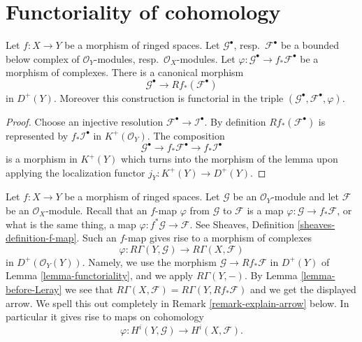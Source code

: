 \section{Functoriality of cohomology}
\label{section-functoriality}

\begin{lemma}
\label{lemma-functoriality}
Let $f : X \to Y$ be a morphism of ringed spaces.
Let $\mathcal{G}^\bullet$, resp.\ $\mathcal{F}^\bullet$ be
a bounded below complex of $\mathcal{O}_Y$-modules,
resp.\ $\mathcal{O}_X$-modules. Let
$\varphi : \mathcal{G}^\bullet \to f_*\mathcal{F}^\bullet$
be a morphism of complexes. There is a canonical morphism
$$
\mathcal{G}^\bullet
\longrightarrow
Rf_*(\mathcal{F}^\bullet)
$$
in $D^{+}(Y)$. Moreover this construction is functorial in the triple
$(\mathcal{G}^\bullet, \mathcal{F}^\bullet, \varphi)$.
\end{lemma}

\begin{proof}
Choose an injective resolution $\mathcal{F}^\bullet \to \mathcal{I}^\bullet$.
By definition $Rf_*(\mathcal{F}^\bullet)$ is represented by
$f_*\mathcal{I}^\bullet$ in $K^{+}(\mathcal{O}_Y)$.
The composition
$$
\mathcal{G}^\bullet \to f_*\mathcal{F}^\bullet \to f_*\mathcal{I}^\bullet
$$
is a morphism in $K^{+}(Y)$ which turns
into the morphism of the lemma upon applying the
localization functor $j_Y : K^{+}(Y) \to D^{+}(Y)$.
\end{proof}

\noindent
Let $f : X \to Y$ be a morphism of ringed spaces.
Let $\mathcal{G}$ be an $\mathcal{O}_Y$-module and let
$\mathcal{F}$ be an $\mathcal{O}_X$-module. Recall that an
$f$-map $\varphi$ from $\mathcal{G}$ to $\mathcal{F}$ is a map
$\varphi : \mathcal{G} \to f_*\mathcal{F}$, or what is the same
thing, a map $\varphi : f^*\mathcal{G} \to \mathcal{F}$.
See Sheaves, Definition \ref{sheaves-definition-f-map}.
Such an $f$-map gives rise to a morphism of complexes
\begin{equation}
\label{equation-functorial-derived}
\varphi :
R\Gamma(Y, \mathcal{G})
\longrightarrow
R\Gamma(X, \mathcal{F})
\end{equation}
in $D^{+}(\mathcal{O}_Y(Y))$. Namely, we use the morphism
$\mathcal{G} \to Rf_*\mathcal{F}$ in $D^{+}(Y)$ of
Lemma \ref{lemma-functoriality}, and we apply $R\Gamma(Y, -)$.
By Lemma \ref{lemma-before-Leray} we see that
$R\Gamma(X, \mathcal{F}) = R\Gamma(Y, Rf_*\mathcal{F})$
and we get the displayed arrow. We spell this out completely in
Remark \ref{remark-explain-arrow} below.
In particular it gives
rise to maps on cohomology
\begin{equation}
\label{equation-functorial}
\varphi : H^i(Y, \mathcal{G}) \longrightarrow H^i(X, \mathcal{F}).
\end{equation}

